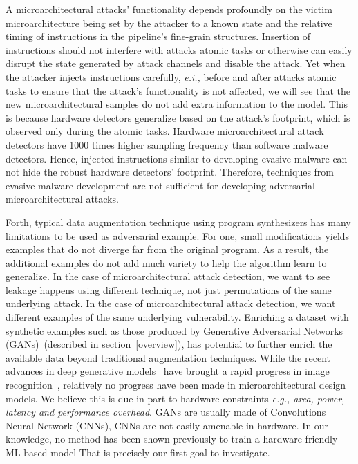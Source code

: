A microarchitectural attacks' functionality depends profoundly on the victim microarchitecture being set by the attacker to a known state and the relative timing of instructions in the pipeline's fine-grain structures. 
Insertion of instructions should not interfere with attacks atomic tasks or otherwise can easily disrupt the state generated by attack channels and disable the attack. Yet when the attacker injects instructions carefully, {\em e.i.,} before and after attacks atomic tasks to ensure that the attack's functionality is not affected, we will see that the new microarchitectural samples do not add extra information to the model. This is because hardware detectors generalize based on the attack's footprint, which is observed only during the atomic tasks. Hardware microarchitectural attack detectors have 1000 times higher sampling frequency than software malware detectors. Hence, injected instructions similar to developing evasive malware can not hide the robust hardware detectors' footprint. Therefore,  techniques from evasive malware development are not sufficient for developing adversarial microarchitectural attacks. 

Forth,  
typical data augmentation technique using program synthesizers has many limitations to be used as adversarial example. For one, small modifications yields examples that do not diverge far from the original program. As a result, the additional examples do not add much variety to help the algorithm learn to generalize. In the case of microarchitectural attack detection, we want to see leakage happens using different technique, not just permutations of the same underlying attack.
In the case of microarchitectural attack detection, we want different examples of the same underlying vulnerability. Enriching a dataset with synthetic examples such as those produced by Generative Adversarial Networks (GANs)~\cite{goodfellow2014generative}(described in section~\ref{overview}), has potential to further enrich the available data beyond traditional augmentation techniques. While the recent advances in deep generative models~\cite{goodfellow2014generative} have brought a rapid progress in image recognition~\cite{}, relatively no progress have been made in microarchitectural design models. We believe this is due in part to hardware constraints {\em e.g., area, power, latency and performance overhead}. GANs are usually made of Convolutions Neural Network (CNNs), CNNs are not easily amenable in hardware. In our knowledge, no method has been shown previously to train a hardware friendly ML-based model  That is precisely our first goal to investigate. 

